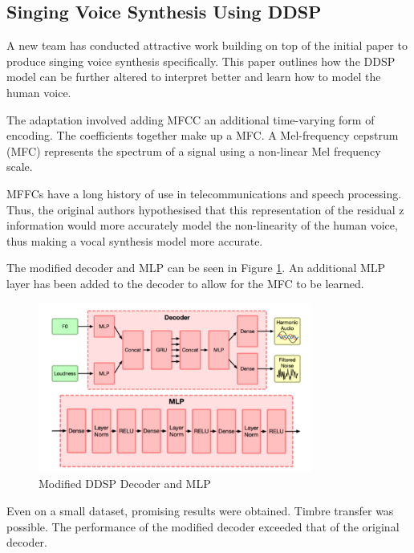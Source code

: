 \subsection{Singing Voice Synthesis Using DDSP}
\label{sec:singing_voice_synthesis}

A new team has conducted attractive work building on top of the initial paper to produce singing voice synthesis\cite{SingingDDSP} specifically. This paper outlines how the DDSP model can be further altered to interpret better and learn how to model the human voice.

The adaptation involved adding \acrfull{MFCC} an additional time-varying form of encoding. The coefficients together make up a \acrfull{MFC}. A Mel-frequency cepstrum (MFC) represents the spectrum of a signal using a non-linear Mel frequency scale.

MFFCs have a long history of use in telecommunications and speech processing\cite{MFCCHistory}. Thus, the original authors hypothesised that this representation of the residual z information would more accurately model the non-linearity of the human voice, thus making a vocal synthesis model more accurate.

The modified decoder and MLP can be seen in Figure \ref{fig:singing_decoder_mlp}. An additional MLP layer has been added to the decoder to allow for the MFC to be learned.

\begin{figure}[!ht]
    \centering
    \includegraphics[width=0.8\textwidth]{literature_review/SingingDecoderMLP.png}
    \caption{Modified DDSP Decoder and MLP\cite{SingingDDSP}}
    \label{fig:singing_decoder_mlp}
\end{figure}

Even on a small dataset, promising results were obtained. Timbre transfer was possible. The performance of the modified decoder exceeded that of the original decoder.

